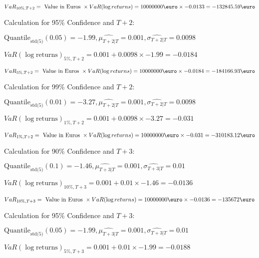 \indent\indent $VaR_{10\%, T + 2} = \text{ Value in Euros } \times VaR(\log returns) = 10 000 000 \text{\euro} \times-0.0133 = -132845.59 \text{\euro}$\newline




Calculation for 95\% Confidence and $T+2$:

\indent\indent $\text{Quantile}_\text{std(5)}(0.05) = -1.99,\hat{\mu_{T+2|T}} = 0.001, \hat{\sigma_{T+2|T}} = 0.0098$

\indent\indent $VaR(\log \text{returns})_{5\%, T + 2} = 0.001 + 0.0098\times-1.99 = -0.0184$

\indent\indent $VaR_{5\%, T + 2} = \text{ Value in Euros } \times VaR(\log returns) = 10 000 000 \text{\euro} \times-0.0184 = -184166.93 \text{\euro}$\newline




Calculation for 99\% Confidence and $T+2$:

\indent\indent $\text{Quantile}_\text{std(5)}(0.01) = -3.27,\hat{\mu_{T+2|T}} = 0.001, \hat{\sigma_{T+2|T}} = 0.0098$

\indent\indent $VaR(\log \text{returns})_{1\%, T + 2} = 0.001 + 0.0098\times-3.27 = -0.031$

\indent\indent $VaR_{1\%, T + 2} = \text{ Value in Euros } \times VaR(\log returns) = 10 000 000 \text{\euro} \times-0.031 = -310183.12 \text{\euro}$\newline




Calculation for 90\% Confidence and $T+3$:

\indent\indent $\text{Quantile}_\text{std(5)}(0.1) = -1.46,\hat{\mu_{T+3|T}} = 0.001, \hat{\sigma_{T+3|T}} = 0.01$

\indent\indent $VaR(\log \text{returns})_{10\%, T + 3} = 0.001 + 0.01\times-1.46 = -0.0136$

\indent\indent $VaR_{10\%, T + 3} = \text{ Value in Euros } \times VaR(\log returns) = 10 000 000 \text{\euro} \times-0.0136 = -135672 \text{\euro}$\newline




Calculation for 95\% Confidence and $T+3$:

\indent\indent $\text{Quantile}_\text{std(5)}(0.05) = -1.99,\hat{\mu_{T+3|T}} = 0.001, \hat{\sigma_{T+3|T}} = 0.01$

\indent\indent $VaR(\log \text{returns})_{5\%, T + 3} = 0.001 + 0.01\times-1.99 = -0.0188$

